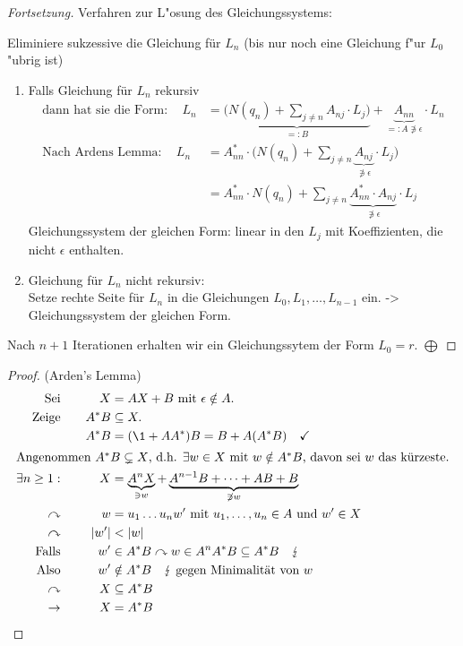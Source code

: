 \begin{proof}[Fortsetzung]
    Verfahren zur L"osung des Gleichungssystems:
    
	Eliminiere sukzessive die Gleichung für $L_n$ (bis nur noch eine Gleichung f"ur $L_0$ "ubrig ist)
	\begin{enumerate}[label=(\arabic*)]
		\item Falls Gleichung für $L_n$ rekursiv
			\begin{align*}
				\text{dann hat sie die Form}:\quad L_n &= \underbrace{\Big( N(q_n)+\sum_{j\neq n} A_{nj}\cdot L_j \Big)}_{=: B} + \underbrace{A_{nn}}_{=: A \not\ni \epsilon}\cdot L_n\\
				\text{Nach Ardens Lemma}:\quad L_n &= A_{nn}^*\cdot \Big( N(q_n)+\sum_{j\neq n} \underbrace{A_{nj}}_{\not\ni\epsilon} \cdot L_j \Big)\\
				&= A_{nn}^*\cdot N(q_n) + \sum_{j\neq n} \underbrace{A_{nn}^*\cdot A_{nj}}_{\not\ni\epsilon} \cdot L_j
			\end{align*}
			Gleichungssystem der gleichen Form: linear in den $L_j$ mit Koeffizienten, die nicht $\epsilon$ enthalten.
		\item Gleichung für $L_n$ nicht rekursiv:\\
		Setze rechte Seite für $L_n$ in die Gleichungen $L_0, L_1, \dots, L_{n-1}$ ein. \--> Gleichungssystem der gleichen Form.
	\end{enumerate}
    Nach $n+1$ Iterationen erhalten wir ein Gleichungssytem der Form $L_0=r$. \hfill$\bigoplus$
\end{proof}
\begin{proof}(Arden's Lemma)
	\begin{alignat*}{3}
		\text{Sei}&\quad& X&= AX+B\text{ mit }\epsilon\notin A.\\
		\text{Zeige}&& A^*B&\subseteq X.\\
		&& A^*B &= (\1+AA^*)B = B+A(A^*B) \quad\checkmark\\
		\shortintertext{Angenommen $A^*B \subsetneq X$, d.h. $\exists w\in X$ mit $w\notin A^*B$, davon sei $w$ das kürzeste.}
		\exists n\geq 1: && X &= \underbrace{A^nX}_{\ni w} + \underbrace{A^{n-1}B+\dots +AB+B}_{\not\ni w}\\
		\curvearrowright && w &= u_1\dots u_n w'\text{ mit } u_1,\dots,u_n\in A\text{ und } w'\in X\\
		\curvearrowright && |w'| &< |w|\\
		\text{Falls}&& w'&\in A^*B \curvearrowright w\in A^nA^*B\subseteq A^*B \quad \lightning\\
		\text{Also} && w'&\notin A^*B \quad\lightning\text{ gegen Minimalität von }w\\
		\curvearrowright && X&\subseteq A^*B\\
		\-> && X &= A^*B \tag*{\qedhere}
	\end{alignat*}
\end{proof}

